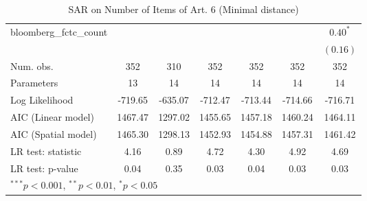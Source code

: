 \begin{table}[!h]
\begin{center}
\begin{tabular}{l c c c c c c }
bloomberg\_fctc\_count  &              &              &              &              &              & $0.40^{*}$   \\
                        &              &              &              &              &              & $(0.16)$     \\
\midrule
Num. obs.               & 352          & 310          & 352          & 352          & 352          & 352          \\
Parameters              & 13           & 14           & 14           & 14           & 14           & 14           \\
Log Likelihood          & -719.65      & -635.07      & -712.47      & -713.44      & -714.66      & -716.71      \\
AIC (Linear model)      & 1467.47      & 1297.02      & 1455.65      & 1457.18      & 1460.24      & 1464.11      \\
AIC (Spatial model)     & 1465.30      & 1298.13      & 1452.93      & 1454.88      & 1457.31      & 1461.42      \\
LR test: statistic      & 4.16         & 0.89         & 4.72         & 4.30         & 4.92         & 4.69         \\
LR test: p-value        & 0.04         & 0.35         & 0.03         & 0.04         & 0.03         & 0.03         \\
\bottomrule
\multicolumn{7}{l}{\scriptsize{$^{***}p<0.001$, $^{**}p<0.01$, $^*p<0.05$}}
\end{tabular}
\caption{SAR on Number of Items of Art. 6 (Minimal distance)}
\label{table:coefficients}
\end{center}
\end{table}

